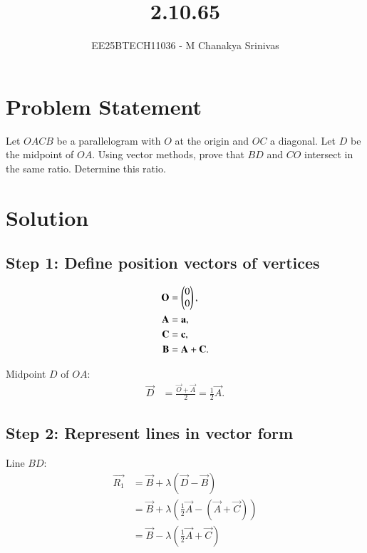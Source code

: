 \documentclass[journal]{IEEEtran}
\begin{document}

\vspace{3cm}

\title{2.10.65}
\author{EE25BTECH11036 - M Chanakya Srinivas}
\maketitle

\renewcommand{\thetable}{\theenumi}
\setlength{\intextsep}{10pt}
\renewcommand\theequation{\arabic{equation}}





\section*{Problem Statement}
Let \(OACB\) be a parallelogram with \(O\) at the origin and \(OC\) a diagonal. Let \(D\) be the midpoint of \(OA\). Using vector methods, prove that \(BD\) and \(CO\) intersect in the same ratio. Determine this ratio.

\section*{Solution}

\subsection*{Step 1: Define position vectors of vertices}
\begin{align}
\mathbf{O} &= \begin{pmatrix}0\\0\end{pmatrix}, \\
\mathbf{A} &= \mathbf{a}, \\
\mathbf{C} &= \mathbf{c}, \\
\mathbf{B} &= \mathbf{A} + \mathbf{C}.
\end{align}

Midpoint \(D\) of \(OA\):
\begin{align}
\vec{D} &= \frac{\vec{O} + \vec{A}}{2} = \frac{1}{2} \vec{A}.
\end{align}

\subsection*{Step 2: Represent lines in vector form}

Line \(BD\):
\begin{align}
\vec{R_1} &= \vec{B} + \lambda (\vec{D} - \vec{B}) \\
&= \vec{B} + \lambda \left(\frac{1}{2}\vec{A} - (\vec{A} + \vec{C})\right) \\
&= \vec{B} - \lambda \left(\frac{1}{2}\vec{A} + \vec{C}\right)
\end{align}
\end{document}
